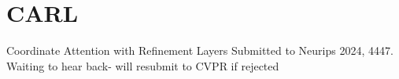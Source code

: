\documentclass{beamer}
\begin{document}
\begin{frame}
\vspace*{-1pt}
\end{frame}
\begin{frame}
\vspace*{-1pt}
\end{frame}
	
\section{CARL}

\begin{frame}{Coordinate Attention with Refinement Layers}
	Submitted to Neurips 2024, 4447.
	Waiting to hear back- will resubmit to CVPR if rejected
\end{frame}
\end{document}
